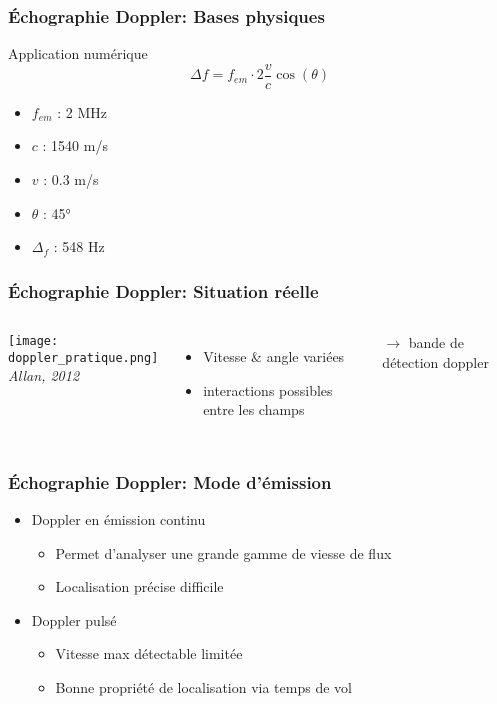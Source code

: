 \documentclass{beamer}
\begin{document}
\begin{frame}
\frametitle{\'Echographie Doppler:  Bases physiques}
Application numérique
\\
\vspace{0.5cm} 
\[ \Delta f = f_{em} \cdot 2 \frac{v}{c} \cos(\theta) \]
\vspace{0.5cm}
\begin{itemize}
\item $f_{em}$ : 2 MHz
\item $c$ : 1540 m/s
\vspace{0.2cm}
\item $v$ : 0.3 m/s 
\vspace{0.2cm}
\item $\theta$ : 45°
\vspace{0.2cm}
\item $\Delta_f$ : 548 Hz
\end{itemize}
\end{frame}

\begin{frame}
\frametitle{\'Echographie Doppler: Situation réelle  }
\begin{columns}
\column{60mm}
\texttt{[image: doppler\_pratique.png]}\\
\textit{Allan, 2012}
\column{60mm}
\begin{itemize}
\item Vitesse \& angle variées 
\vspace{0.2cm}
\item interactions possibles entre les champs 
\end{itemize}
$\rightarrow$ bande de détection doppler
\end{columns}
\end{frame}

\begin{frame}
\frametitle{\'Echographie Doppler: Mode d'émission }
\begin{itemize}
\item Doppler en émission continu
\vspace{0.2cm}
\begin{itemize}
\item Permet d'analyser une grande gamme de viesse de flux 
\vspace{0.2cm}
\item Localisation précise difficile
\vspace{0.2cm}
\end{itemize}
\item Doppler pulsé
\vspace{0.2cm}
\begin{itemize}
\item Vitesse max détectable limitée\\
\vspace{0.2cm}
\item Bonne propriété de localisation via temps de vol
\end{itemize}
\end{itemize}
\end{frame}
\end{document}
